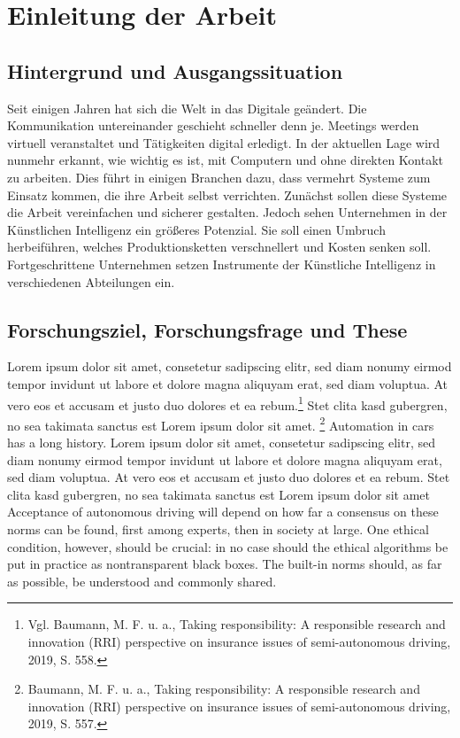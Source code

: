 \chapter{Einleitung der Arbeit}

\section{Hintergrund und Ausgangssituation}

Seit einigen Jahren hat sich die Welt in das Digitale geändert. Die Kommunikation untereinander geschieht schneller denn je. 
Meetings werden virtuell veranstaltet und Tätigkeiten digital erledigt. In der aktuellen Lage wird nunmehr erkannt, wie wichtig es ist, mit Computern und ohne direkten Kontakt zu arbeiten.
Dies führt in einigen Branchen dazu, dass vermehrt Systeme zum Einsatz kommen, die ihre Arbeit selbst verrichten. Zunächst sollen diese Systeme die Arbeit vereinfachen und sicherer gestalten.
Jedoch sehen Unternehmen in der Künstlichen Intelligenz ein größeres Potenzial. Sie soll einen Umbruch herbeiführen, welches Produktionsketten verschnellert und Kosten senken soll. Fortgeschrittene Unternehmen
setzen Instrumente der Künstliche Intelligenz in verschiedenen Abteilungen ein.


\section{Forschungsziel, Forschungsfrage und These}

Lorem ipsum dolor sit amet, consetetur sadipscing elitr, sed diam nonumy eirmod tempor invidunt ut labore et dolore magna aliquyam erat, sed diam voluptua. 
At vero eos et accusam et justo duo dolores et ea rebum.\footnote{Vgl. Baumann, M. F. u. a., Taking responsibility: A responsible research and innovation (RRI) perspective on insurance issues of semi-autonomous driving, 2019, S. 558.} 
Stet clita kasd gubergren, no sea takimata sanctus est Lorem ipsum dolor sit amet. \footnote{Baumann, M. F. u. a., Taking responsibility: A responsible research and innovation (RRI) perspective on insurance issues of semi-autonomous driving, 2019, S. 557.}
Automation in cars has a long history.  Lorem ipsum dolor sit amet, consetetur sadipscing elitr, sed diam nonumy eirmod tempor invidunt ut labore et dolore magna aliquyam erat, sed diam voluptua. 
At vero eos et accusam et justo duo dolores et ea rebum. 
Stet clita kasd gubergren, no sea takimata sanctus est Lorem ipsum dolor sit amet Acceptance of autonomous driving will depend on how far a consensus on these norms can be found, first among experts, then in society at large. 
One ethical condition, however, should be crucial: in no case should the ethical algorithms be put in practice as nontransparent black boxes. 
The built-in norms should, as far as possible, be understood and commonly shared.



